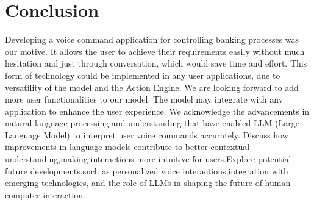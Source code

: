 \chapter{Conclusion}

Developing a voice command application for controlling banking processes was our motive. It allows the user to achieve their requirements easily without much hesitation and just through conversation, which would save time and effort. This form of technology could be implemented in any user applications, due to versatility of the model and the Action Engine. We are looking forward to add more user functionalities to our model. The model may integrate with any application to enhance the user experience. We acknowledge the advancements in natural language processing and understanding that have enabled LLM (Large Language Model) to interpret user voice commands accurately. Discuss how improvements in language models contribute to better  contextual understanding,making interactions more intuitive for users.Explore potential future developments,such as personalized voice interactions,integration with emerging technologies, and the role of LLMs in shaping the future of human computer interaction.     